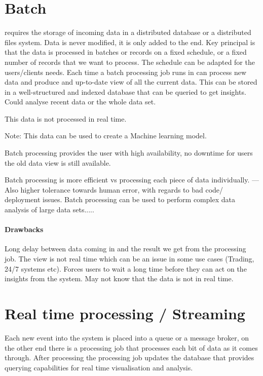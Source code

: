 \documentclass[a4paper, 11pt]{book}
\begin{document}
    \section{Batch}
    requires the storage of incoming data in a distributed database or a distributed files system.
    Data is never modified, it is only added to the end.
    Key principal is that the data is processed in batches or records on a fixed schedule, or a fixed number of records that we want to process.
    The schedule can be adapted for the users/clients needs.
    Each time a batch processing job runs in can process new data and produce and up-to-date view of all the current data.
    This can be stored in a well-structured and indexed database that can be queried to get insights.
    Could analyse recent data or the whole data set.

    This data is not processed in real time.

    Note: This data can be used to create a Machine learning model.

    Batch processing provides the user with high availability, no downtime for users the old data view is still available.

    Batch processing is more efficient vs processing each piece of data individually.
    --- Also higher tolerance towards human error, with regards to bad code/ deployment issues.
    Batch processing can be used to perform complex data analysis of large data sets.....

    \paragraph{Drawbacks}
    Long delay between data coming in and the result we get from the processing job.
    The view is not real time which can be an issue in some use cases (Trading, 24/7 systems etc).
    Forces users to wait a long time before they can act on the insights from the system.
    May not know that the data is not in real time.

    \section{Real time processing / Streaming}
    Each new event into the system is placed into a queue or a message broker, on the other end there is a processing job that processes each bit of data as it comes through.
    After processing the processing job updates the database that provides querying capabilities for real time visualisation and analysis.
\end{document}

